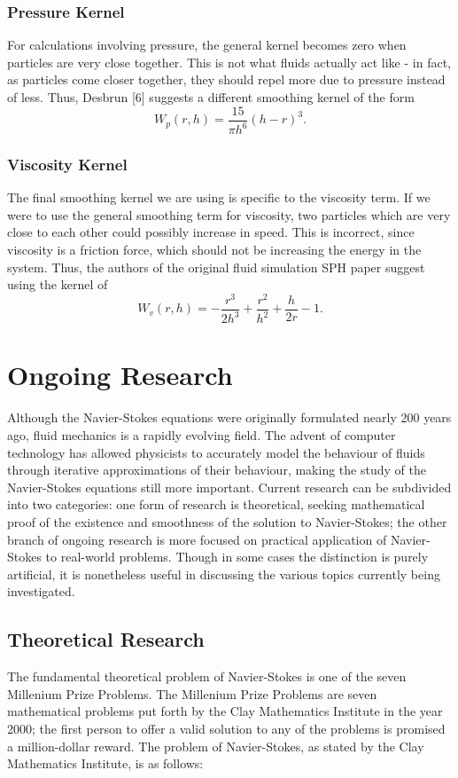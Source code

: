 \documentclass[a4paper]{article}
\begin{document}
\subsubsection*{Pressure Kernel}
For calculations involving pressure, the general kernel becomes zero when particles are very close together. This is not what fluids actually act like - in fact, as particles come closer together, they should repel more due to pressure instead of less. Thus, Desbrun [6] suggests a different smoothing kernel of the form
\[W_{p}( r, h) = \frac{15}{\pi h^6} \left(h - r\right)^3.\]

\subsubsection*{Viscosity Kernel}
The final smoothing kernel we are using is specific to the viscosity term. If we were to use the general smoothing term for viscosity, two particles which are very close to each other could possibly increase in speed. This is incorrect, since viscosity is a friction force, which should not be increasing the energy in the system. Thus, the authors of the original fluid simulation SPH paper suggest using the kernel of
\[W_{v}(r, h) = -\frac{r^3}{2h^3} + \frac{r^2}{h^2} + \frac{h}{2r} - 1.\]

\section*{Ongoing Research}
Although the Navier-Stokes equations were originally formulated nearly 200 years ago, fluid mechanics is a rapidly evolving field. The advent of computer technology has allowed physicists to accurately model the behaviour of fluids through iterative approximations of their behaviour, making the study of the Navier-Stokes equations still more important. Current research can be subdivided into two categories: one form of research is theoretical, seeking mathematical proof of the existence and smoothness of the solution to Navier-Stokes; the other branch of ongoing research is more focused on practical application of Navier-Stokes to real-world problems. Though in some cases the distinction is purely artificial, it is nonetheless useful in discussing the various topics currently being investigated.

\subsection*{Theoretical Research}
The fundamental theoretical problem of Navier-Stokes is one of the seven Millenium Prize Problems. The Millenium Prize Problems are seven mathematical problems put forth by the Clay Mathematics Institute in the year 2000; the first person to offer a valid solution to any of the problems is promised a million-dollar reward. The problem of Navier-Stokes, as stated by the Clay Mathematics Institute, is as follows:\\
\end{document}
